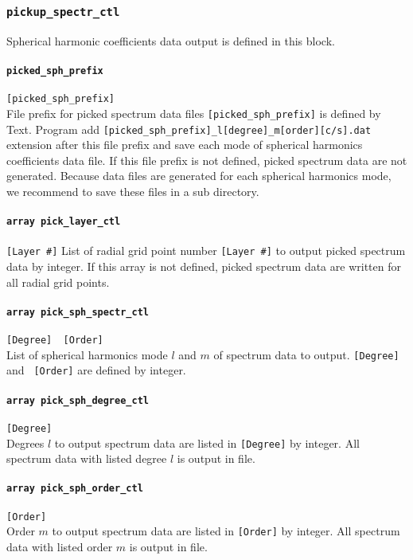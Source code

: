 %
\subsubsection{\tt pickup\_spectr\_ctl}
\label{href_t:pickup_spectr_ctl}
Spherical harmonic coefficients data output is defined in this block.

\paragraph{\tt picked\_sph\_prefix}
\label{href_t:picked_sph_prefix}
\verb|[picked_sph_prefix]| \\
File prefix for picked spectrum data files \verb|[picked_sph_prefix]| is defined by Text. Program add {\tt [picked\_sph\_prefix]\_l[degree]\_m[order][c/s].dat} extension after this file prefix and save each mode of spherical harmonics coefficients data file. If this file prefix is not defined, picked spectrum data are not generated. Because data files are generated for each spherical harmonics mode, we recommend to save these files in a sub directory.

\paragraph{\tt array pick\_layer\_ctl}
\label{href_t:pick_layer_ctl}
\verb|[Layer #]|
List of radial grid point number \verb|[Layer #]| to output picked spectrum data by integer. If this array is not defined, picked spectrum data are written for all radial grid points.

\paragraph{\tt array pick\_sph\_spectr\_ctl}
\label{href_t:pick_sph_spectr_ctl}
\verb|[Degree]  [Order]| \\
List of spherical harmonics mode $l$ and $m$ of spectrum data to output. \verb|[Degree]| and \verb| [Order]| are defined by integer.

\paragraph{\tt array pick\_sph\_degree\_ctl}
\label{href_t:pick_sph_degree_ctl}
\verb|[Degree]| \\
Degrees $l$ to output spectrum data are listed in \verb|[Degree]| by integer. All spectrum data with listed degree $l$ is output in file.

\paragraph{\tt array pick\_sph\_order\_ctl}
\label{href_t:pick_sph_order_ctl}
\verb|[Order]| \\
Order $m$ to output spectrum data are listed in \verb|[Order]| by integer. All spectrum data with listed order $m$ is output in file.


